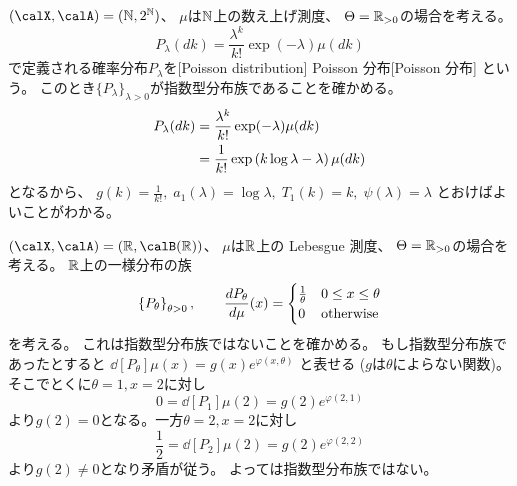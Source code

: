 \documentclass[report]{jlreq}
\begin{document}
\begin{example}[Poisson 分布]
    $(\calX, \calA) = (\N, 2^\N)$、
    $\mu$は$\mathbb{N}$上の数え上げ測度、
    $\Theta = \mathbb{R}_{> 0}$の場合を考える。
    \begin{equation}
        P_\lambda(dk)
            = \frac{\lambda^k}{k!} \exp(-\lambda) \mu(dk)
    \end{equation}
    で定義される確率分布$P_\lambda$を[Poisson distribution]
        {Poisson 分布}[Poisson 分布]
    という。
    このとき$\{ P_\lambda \}_{\lambda > 0}$が指数型分布族であることを確かめる。
    \begin{alignat}{1}
        P_\lambda(dk)
            &= \frac{\lambda^k}{k!} \exp(-\lambda) \mu(dk) \\
            &= \frac{1}{k!} \exp\left({
                k \log\lambda - \lambda
            }\right) \mu(dk)
    \end{alignat}
    となるから、
    $g(k) = \frac{1}{k!}, \;
        a_1(\lambda) = \log\lambda, \;
        T_1(k) = k, \;
        \psi(\lambda) = \lambda$
    とおけばよいことがわかる。
\end{example}

\begin{example}[指数型分布族でない例]
    $(\calX, \calA) = (\R, \calB(\R))$、
    $\mu$は$\mathbb{R}$上の Lebesgue 測度、
    $\Theta = \mathbb{R}_{> 0}$の場合を考える。
    $\mathbb{R}$上の一様分布の族
    \begin{equation}
        \locallabel{eq:uniform}
        \mybrace{ P_\theta }_{\theta > 0},
            \qquad
            \dd[P_\theta]{\mu}(x) = \begin{cases}
                \frac{1}{\theta} & 0 \leq x \leq \theta \\
                0 & \text{otherwise}
            \end{cases}
    \end{equation}
    を考える。
    これは指数型分布族ではないことを確かめる。
    もし指数型分布族であったとすると
    $\dd[P_\theta]{\mu}(x) = g(x) e^{\varphi(x, \theta)}$
    と表せる ($g$は$\theta$によらない関数)。
    そこでとくに$\theta = 1, x = 2$に対し
    \begin{equation}
        0 = \dd[P_1]{\mu}(2) = g(2) e^{\varphi(2, 1)}
    \end{equation}
    より$g(2) = 0$となる。一方$\theta = 2, x = 2$に対し
    \begin{equation}
        \frac{1}{2} = \dd[P_2]{\mu}(2) = g(2) e^{\varphi(2, 2)}
    \end{equation}
    より$g(2) \neq 0$となり矛盾が従う。
    よっては指数型分布族ではない。
\end{example}
\end{document}

